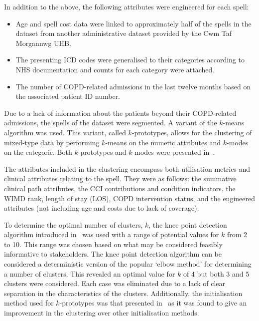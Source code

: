 In addition to the above, the following attributes were engineered for each
spell:
\begin{itemize}
    \item Age and spell cost data were linked to approximately half of the
        spells in the dataset from another administrative dataset provided by
        the Cwm Taf Morgannwg UHB.\
    \item The presenting ICD codes were generalised to their categories
        according to NHS documentation and counts for each category were
        attached.
    \item The number of COPD-related admissions in the last twelve months based
        on the associated patient ID number.
\end{itemize}

Due to a lack of information about the patients beyond their COPD-related
admissions, the spells of the dataset were segmented. A variant of the
\(k\)-means algorithm was used. This variant, called \(k\)-prototypes, allows
for the clustering of mixed-type data by performing \(k\)-means on the numeric
attributes and \(k\)-modes on the categoric. Both \(k\)-prototypes and
\(k\)-modes were presented in~\cite{Huang1998}.

The attributes included in the clustering encompass both utilisation metrics and
clinical attributes relating to the spell. They were as follows: the summative
clinical path attributes, the CCI contributions and condition indicators, the
WIMD rank, length of stay (LOS), COPD intervention status, and the engineered
attributes (not including age and costs due to lack of coverage).

To determine the optimal number of clusters, \(k\), the knee point detection
algorithm introduced in~\cite{Satopaa2011} was used with a range of potential
values for \(k\) from 2 to 10. This range was chosen based on what may be
considered feasibly informative to stakeholders. The knee point detection
algorithm can be considered a deterministic version of the popular `elbow
method' for determining a number of clusters. This revealed an optimal value for
\(k\) of 4 but both 3 and 5 clusters were considered. Each case was eliminated
due to a lack of clear separation in the characteristics of the clusters.
Additionally, the initialisation method used for \(k\)-prototypes was that
presented in~\cite{Wilde2020} as it was found to give an improvement in the
clustering over other initialisation methods.

\begin{table}
    \centering
    \resizebox{\textwidth}{!}{%
        
    }\caption{%
        A summary of clinical and condition-specific characteristics for each
        cluster and the population.
    }\label{tab:summary}
\end{table}

